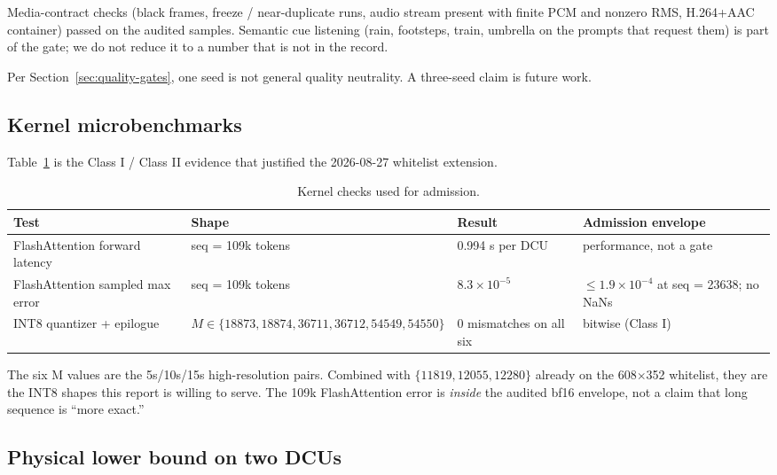 \documentclass[11pt]{article}
\begin{document}
Media-contract checks (black frames, freeze / near-duplicate runs, audio stream present with finite PCM and nonzero RMS, H.264+AAC container) passed on the audited samples. Semantic cue listening (rain, footsteps, train, umbrella on the prompts that request them) is part of the gate; we do not reduce it to a number that is not in the record.

Per Section~\ref{sec:quality-gates}, one seed is not general quality neutrality. A three-seed claim is future work.

\subsection{Kernel microbenchmarks}
\label{sec:micro}

Table~\ref{tab:kernels} is the Class I / Class II evidence that justified the 2026-08-27 whitelist extension.

\begin{table}[htbp]
\centering
\caption{Kernel checks used for admission.}
\label{tab:kernels}
\scriptsize
\setlength{\tabcolsep}{4pt}
\begin{tabular}{p{}p{}p{}p{}}
\toprule
Test & Shape & Result & Admission envelope \\
\midrule
FlashAttention forward latency & seq = 109k tokens & 0.994 s per DCU & performance, not a gate \\
FlashAttention sampled max error & seq = 109k tokens & $8.3\times 10^{-5}$ & $\leq 1.9\times 10^{-4}$ at seq = 23638; no NaNs \\
INT8 quantizer + epilogue & $M \in \{18873, 18874, 36711, 36712, 54549, 54550\}$ & 0 mismatches on all six & bitwise (Class I) \\
\bottomrule
\end{tabular}
\end{table}

The six M values are the 5s/10s/15s high-resolution pairs. Combined with $\{11819, 12055, 12280\}$ already on the 608$\times$352 whitelist, they are the INT8 shapes this report is willing to serve. The 109k FlashAttention error is \emph{inside} the audited bf16 envelope, not a claim that long sequence is ``more exact.''

\subsection{Physical lower bound on two DCUs}
\label{sec:bound}
\end{document}
